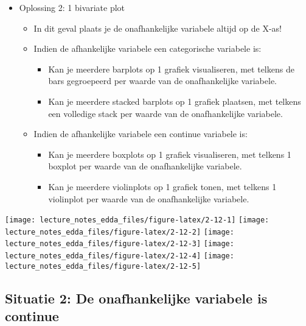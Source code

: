 \documentclass[]{memoir}
\providecommand{\tightlist}{%
  \setlength{\itemsep}{0pt}\setlength{\parskip}{0pt}}
\begin{document}
\begin{itemize}
\tightlist
\item
  Oplossing 2: 1 bivariate plot

  \begin{itemize}
  \tightlist
  \item
    In dit geval plaats je de onafhankelijke variabele altijd op de X-as!
  \item
    Indien de afhankelijke variabele een categorische variabele is:

    \begin{itemize}
    \tightlist
    \item
      Kan je meerdere barplots op 1 grafiek visualiseren, met telkens de bars gegroepeerd per waarde van de onafhankelijke variabele.
    \item
      Kan je meerdere stacked barplots op 1 grafiek plaatsen, met telkens een volledige stack per waarde van de onafhankelijke variabele.
    \end{itemize}
  \item
    Indien de afhankelijke variabele een continue variabele is:

    \begin{itemize}
    \tightlist
    \item
      Kan je meerdere boxplots op 1 grafiek visualiseren, met telkens 1 boxplot per waarde van de onafhankelijke variabele.
    \item
      Kan je meerdere violinplots op 1 grafiek tonen, met telkens 1 violinplot per waarde van de onafhankelijke variabele.
    \end{itemize}
  \end{itemize}
\end{itemize}

\texttt{[image: lecture\_notes\_edda\_files/figure-latex/2-12-1]}
\texttt{[image: lecture\_notes\_edda\_files/figure-latex/2-12-2]}
\texttt{[image: lecture\_notes\_edda\_files/figure-latex/2-12-3]}
\texttt{[image: lecture\_notes\_edda\_files/figure-latex/2-12-4]}
\texttt{[image: lecture\_notes\_edda\_files/figure-latex/2-12-5]}

\hypertarget{situatie-2-de-onafhankelijke-variabele-is-continue}{%
\subsection{Situatie 2: De onafhankelijke variabele is continue}\label{situatie-2-de-onafhankelijke-variabele-is-continue}}
\end{document}
